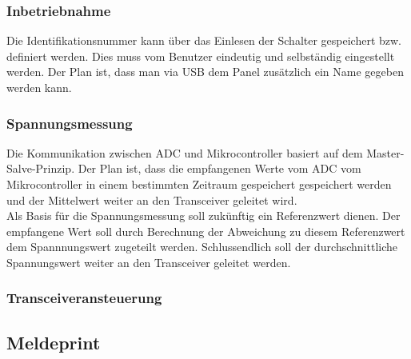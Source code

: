 \subsubsection{Inbetriebnahme}
Die Identifikationsnummer kann über das Einlesen der Schalter gespeichert bzw. definiert werden. Dies muss vom Benutzer eindeutig und selbständig eingestellt werden. Der Plan ist, dass man via USB dem Panel zusätzlich ein Name gegeben werden kann.
\subsubsection{Spannungsmessung}
Die Kommunikation zwischen ADC und Mikrocontroller basiert auf dem Master-Salve-Prinzip. Der Plan ist, dass die empfangenen Werte vom ADC vom Mikrocontroller in einem bestimmten Zeitraum gespeichert gespeichert werden und der Mittelwert weiter an den Transceiver geleitet wird.\\
Als Basis für die Spannungsmessung soll zukünftig ein Referenzwert dienen. Der empfangene Wert soll durch Berechnung der Abweichung zu diesem Referenzwert dem Spannnungswert zugeteilt werden. Schlussendlich soll der durchschnittliche Spannungswert weiter an den Transceiver geleitet werden.
\subsubsection{Transceiveransteuerung}

\newpage
\subsection{Meldeprint}

